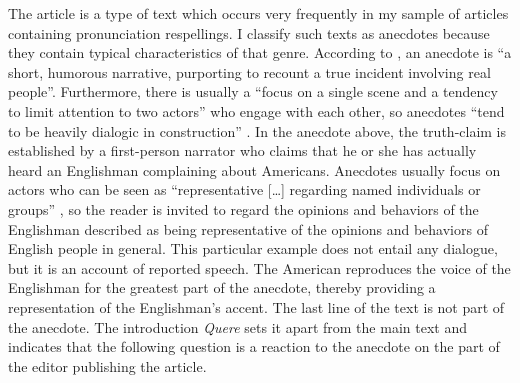The article is a type of text which occurs very frequently in my sample of articles containing pronunciation respellings. I classify such texts as anecdotes because they contain typical characteristics of that genre. According to \citet[22]{Bauman2005}, an anecdote is “a short, humorous narrative, purporting to recount a true incident involving real people”. Furthermore, there is usually a “focus on a single scene and a tendency to limit attention to two actors” who engage with each other, so anecdotes “tend to be heavily dialogic in construction” \citep[22]{Bauman2005}. In the anecdote above, the truth-claim is established by a first-person narrator who claims that he or she has actually heard an Englishman complaining about Americans. Anecdotes usually focus on actors who can be seen as “representative […] regarding named individuals or groups” \citep[73]{Nicolaisen2011}, so the reader is invited to regard the opinions and behaviors of the Englishman described as being representative of the opinions and behaviors of English people in general. This particular example does not entail any dialogue, but it is an account of reported speech. The American reproduces the voice of the Englishman for the greatest part of the anecdote, thereby providing a representation of the Englishman’s accent. The last line of the text is not part of the anecdote. The introduction \emph{Quere} sets it apart from the main text and indicates that the following question is a reaction to the anecdote on the part of the editor publishing the article.


